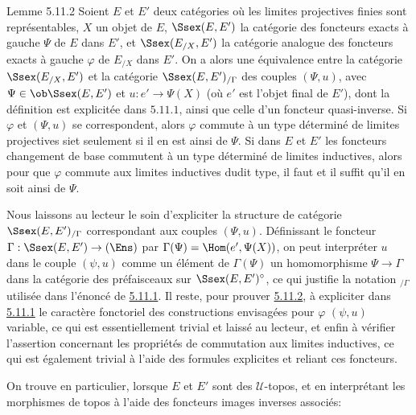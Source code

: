 \documentclass[10pt]{../fichiers-configuration-latex/smfart}
\begin{document}
\begin{enonce*}{Lemme 5.11.2}
Soient $E$ et $E'$ deux catégories où les limites projectives
finies sont représentables, $X$ un objet de $E$, $\Ssex(E,E')$ la
catégorie des foncteurs exacts à gauche $\Psi$ de $E$ dans $E'$, et
$\Ssex(E_{/X},E')$ la catégorie analogue des foncteurs exacts à
gauche $\varphi$ de $E_{/X}$ dans $E'$. On a alors une équivalence
entre la catégorie $\Ssex(E_{/X},E')$ et la catégorie
$\Ssex(E,E')_{/\Gamma}$ des couples $(\Psi,u)$, avec $\Psi\in \ob
\Ssex(E,E')$ et $u:e'\rightarrow \Psi(X)$ (où $e'$ est l'objet
final de $E'$), dont la définition est explicitée dans
$\hyperref[IV.subsubsec5.11.1]{5.11.1}$, ainsi que celle d'un foncteur
quasi-inverse. Si $\varphi$ et $(\Psi,u)$ se correspondent, alors
$\varphi$ commute à un type déterminé de limites projectives
si\pageoriginale et seulement si il en est ainsi de $\Psi$. Si dans
$E$ et $E'$ les foncteurs changement de base commutent à un type
déterminé de limites inductives, alors pour que $\varphi$ commute
aux limites inductives dudit type, il faut et il suffit qu'il en
soit ainsi de $\Psi$.
\end{enonce*}

Nous laissons au lecteur le soin d'expliciter la structure de
catégorie $\Ssex(E,E')_{/\Gamma}$ correspondant aux couples
$(\Psi,u)$. Définissant le foncteur $\Gamma:\Ssex(E,E')\rightarrow
(\Ens)$ par $\Gamma(\Psi)=\Hom(e',\Psi(X))$, on peut interpréter
$u$ dans le couple $(\psi,u)$ comme un élément de $\Gamma(\Psi)$
\ie un homomorphisme $\Psi\rightarrow \Gamma$ dans la catégorie
des préfaisceaux sur $\Ssex(E,E')^{\circ}$, ce qui justifie la
notation ${}_{/\Gamma}$ utilisée dans l'énoncé de
\hyperref[IV.subsubsec5.11.1]{5.11.1}. Il reste, pour prouver \hyperref[IV.lem5.11.2]{5.11.2},
à expliciter dans \hyperref[IV.subsubsec5.11.1]{5.11.1} le caractère
fonctoriel des constructions envisagées pour $\varphi$ \resp
$(\psi,u)$ variable, ce qui est essentiellement trivial et laissé
au lecteur, et enfin à vérifier l'assertion concernant les
propriétés de commutation aux limites inductives, ce qui est
également trivial à l'aide des formules explicites
 et  reliant ces foncteurs.

On trouve en particulier, lorsque $E$ et $E'$ sont des
$𝒰$-topos, et en interprétant les morphismes de topos à
l'aide des foncteurs images inverses associés:
\end{document}
